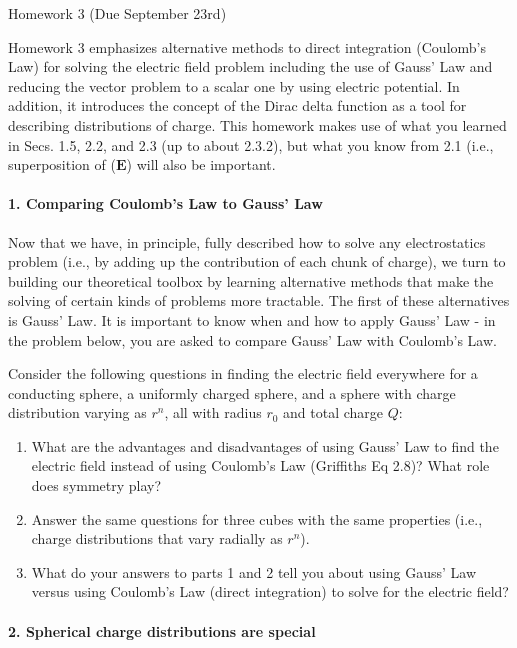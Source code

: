 \documentclass[11pt]{article}
\def\tightlist{}
\begin{document}
{\LARGE Homework 3 (Due September
23rd)}\label{homework-3-due-september-23rd}

Homework 3 emphasizes alternative methods to direct integration
(Coulomb's Law) for solving the electric field problem including the use
of Gauss' Law and reducing the vector problem to a scalar one by using
electric potential. In addition, it introduces the concept of the Dirac
delta function as a tool for describing distributions of charge. This
homework makes use of what you learned in Secs. 1.5, 2.2, and 2.3 (up to
about 2.3.2), but what you know from 2.1 (i.e., superposition of
(\(\mathbf{E}\)) will also be important.

\paragraph{1. Comparing Coulomb's Law to Gauss'
Law}\label{comparing-coulombs-law-to-gauss-law}

Now that we have, in principle, fully described how to solve any
electrostatics problem (i.e., by adding up the contribution of each
chunk of charge), we turn to building our theoretical toolbox by
learning alternative methods that make the solving of certain kinds of
problems more tractable. The first of these alternatives is Gauss' Law.
It is important to know when and how to apply Gauss' Law - in the
problem below, you are asked to compare Gauss' Law with Coulomb's Law.

Consider the following questions in finding the electric field
everywhere for a conducting sphere, a uniformly charged sphere, and a
sphere with charge distribution varying as \(r^n\), all with radius
\(r_0\) and total charge \(Q\):

\begin{enumerate}
\def\labelenumi{\arabic{enumi}.}
\tightlist
\item
  What are the advantages and disadvantages of using Gauss' Law to find
  the electric field instead of using Coulomb's Law (Griffiths Eq 2.8)?
  What role does symmetry play?
\item
  Answer the same questions for three cubes with the same properties
  (i.e., charge distributions that vary radially as \(r^n\)).
\item
  What do your answers to parts 1 and 2 tell you about using Gauss' Law
  versus using Coulomb's Law (direct integration) to solve for the
  electric field?
\end{enumerate}

\paragraph{2. Spherical charge distributions are
special}\label{spherical-charge-distributions-are-special}
\end{document}
